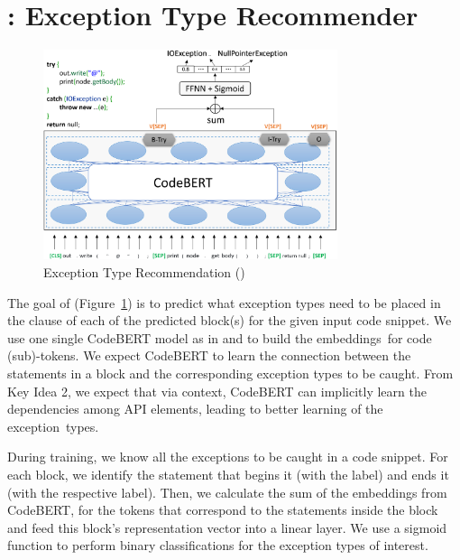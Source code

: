 \section{{\xtype}: Exception Type Recommender}
\label{sec:xtype}

\begin{figure}[t]
\begin{center}
\includegraphics[width=3.4in]{xtype-7.png} %
\vspace{-19pt}
\caption{Exception Type Recommendation ({\xtype})}
\label{fig:xtype}
\end{center}
\end{figure}

The goal of {\xtype} (Figure~\ref{fig:xtype}) is to predict what
exception types need to be placed in the  clause of each
of the predicted  block(s) for the given input code
snippet. We use one single CodeBERT model as
in {\xblock} and {\xstate} to build the embeddings~for code (sub)-tokens.
%
We expect CodeBERT to learn the connection between the statements in a
 block and the corresponding excep\-tion types to be
caught. From Key Idea 2, we expect that via context, CodeBERT can
implicitly learn the dependencies among API elements, leading to
better learning of the exception~types.

During training, we know all the exceptions to be caught in a code
snippet. For each  block, we identify the statement
that begins it (with the  label) and ends it (with the
respective  label). Then, we calculate the sum of the embeddings from
CodeBERT, for the \code{[SEP]} tokens that correspond to the statements
inside the  block and feed this  block's representation vector into a linear layer.
We use a sigmoid function to perform binary classifications for the
exception types of interest.

